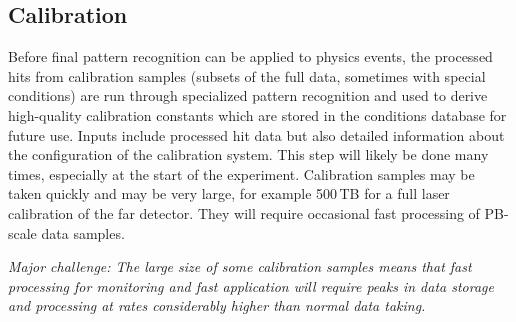 \documentclass[../main-v1.tex]{subfiles}
\begin{document}
\subsection{Calibration }

Before final pattern recognition can be applied to physics events,  the processed hits from calibration samples (subsets of the full data, sometimes with special conditions) are run through specialized pattern recognition and used to derive high-quality calibration constants which are stored in the conditions database for future use.  Inputs include processed hit data but also detailed information about the configuration of the calibration system.  This step will likely be done many times, especially at the start of the experiment. Calibration samples may be taken quickly and may be very large, for example 500\,TB for a full laser calibration of the far detector. They will require occasional fast processing of PB-scale data samples. 

{\it Major challenge: The large size of some calibration samples means that fast processing for monitoring and fast application will require peaks in data storage and processing at rates considerably higher than normal data taking.}

%
%
\end{document}
